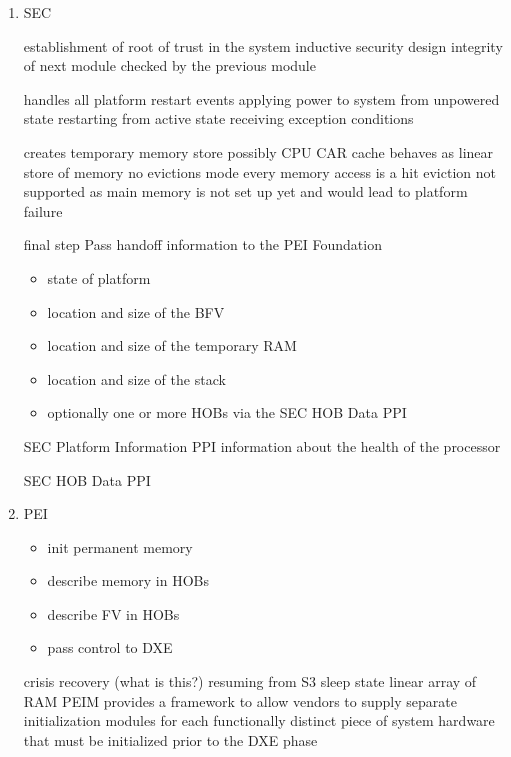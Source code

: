 \begin{enumerate}
    \item{\acf{SEC}}

    establishment of root of trust in the system
    inductive security design
    integrity of next module checked by the previous module

    handles all platform restart events
    applying power to system from unpowered state
    restarting from active state
    receiving exception conditions

    creates temporary memory store
    possibly CPU \ac{CAR}
    cache behaves as linear store of memory
    no evictions mode
    every memory access is a hit
    eviction not supported as main memory is not set up yet and would lead to platform failure


    final step
    Pass handoff information to the \ac{PEI} Foundation
    \begin{itemize}
        \item state of platform
        \item location and size of the \ac{BFV}
        \item location and size of the temporary RAM
        \item location and size of the stack
        \item optionally one or more \acp{HOB} via the \ac{SEC} \ac{HOB} Data \ac{PPI}
    \end{itemize}

    SEC Platform Information PPI
    information about the health of the processor

    SEC HOB Data PPI

    \item{\acf{PEI}}

    \begin{itemize}
        \item init permanent memory
        \item describe memory in \acp{HOB}
        \item describe \ac{FV} in \acp{HOB}
        \item pass control to \ac{DXE}
    \end{itemize}

    crisis recovery (what is this?)
    resuming from S3 sleep state
    linear array of RAM
    \ac{PEIM} provides a framework to allow vendors to supply separate initialization modules for
    each functionally distinct piece of system hardware that must be initialized prior to the DXE phase \cite{pi-spec}


\end{enumerate}
